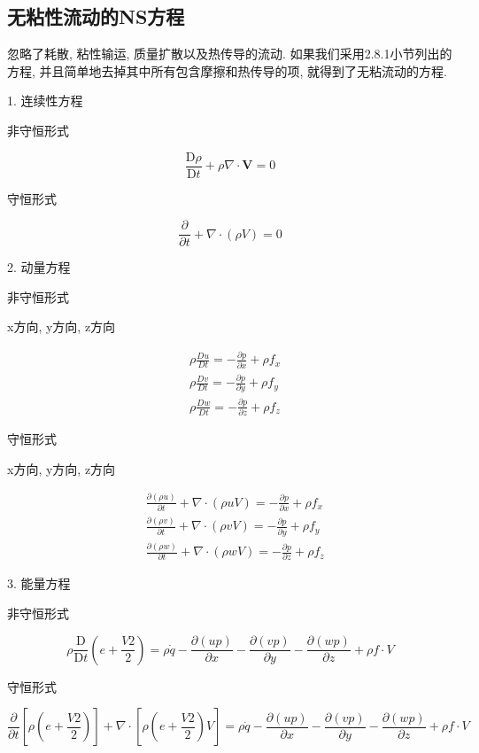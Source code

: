 \documentclass[UTF8]{ctexart}
\begin{document}
\subsection{无粘性流动的NS方程}
忽略了耗散, 粘性输运, 质量扩散以及热传导的流动. 如果我们采用2.8.1小节列出的方程, 并且简单地去掉其中所有包含摩擦和热传导的项, 就得到了无粘流动的方程.

1. 连续性方程

非守恒形式

$$
	\frac{\mathrm{D} \rho}{\mathrm{D} t}+\rho \nabla \cdot \boldsymbol{V}=0
$$

守恒形式


$$
	\frac{\partial}{\partial t}+\nabla \cdot(\rho V)=0
$$

2. 动量方程

非守恒形式

x方向, y方向, z方向

$$
	\begin{aligned}
		 & \rho \frac{D u}{D t}=-\frac{\partial p}{\partial x}+\rho f_{x} \\
		 & \rho \frac{D v}{D t}=-\frac{\partial p}{\partial y}+\rho f_{y} \\
		 & \rho \frac{D w}{D t}=-\frac{\partial p}{\partial z}+\rho f_{z}
	\end{aligned}
$$

守恒形式

x方向, y方向, z方向

$$
	\begin{aligned}
		 & \frac{\partial(\rho u)}{\partial t}+\nabla \cdot(\rho u V)=-\frac{\partial p}{\partial x}+\rho f_{x} \\
		 & \frac{\partial(\rho v)}{\partial t}+\nabla \cdot(\rho v V)=-\frac{\partial p}{\partial y}+\rho f_{y} \\
		 & \frac{\partial(\rho w)}{\partial t}+\nabla \cdot(\rho w V)=-\frac{\partial p}{\partial z}+\rho f_{z}
	\end{aligned}
$$

3. 能量方程

非守恒形式

$$
	\rho \frac{\mathrm{D}}{\mathrm{D} t}\left(e+\frac{V 2}{2}\right)=\rho \dot{q}-\frac{\partial(u p)}{\partial x}-\frac{\partial(v p)}{\partial y}-\frac{\partial(w p)}{\partial z}+\rho f \cdot V
$$

守恒形式

$$
	\frac{\partial}{\partial t}\left[\rho\left(e+\frac{V 2}{2}\right)\right]+\nabla \cdot\left[\rho\left(e+\frac{V 2}{2}\right) V\right]=\rho \dot{q}-\frac{\partial(u p)}{\partial x}-\frac{\partial(v p)}{\partial y}-\frac{\partial(w p)}{\partial z}+\rho f \cdot V
$$
\end{document}
